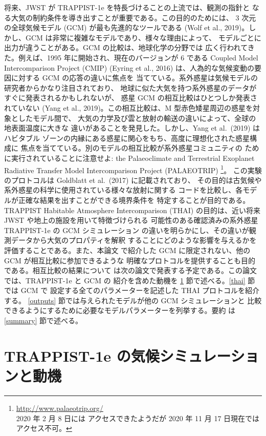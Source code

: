 \documentclass{dennou777}
\begin{document}
将来、JWST が TRAPPIST-1e を特長づけることの上流では、観測の指針と
なる大気の制約条件を導き出すことが重要である。この目的のためには、
3 次元の全球気候モデル (GCM) が最も先進的なツールである (Wolf et al.,
2019)。しかし、GCM は非常に複雑なモデルであり、様々な理由によって、
モデルごとに出力が違うことがある。GCM の比較は、地球化学の分野では
広く行われてきた。例えば、1995 年に開始され、現在のバージョンが 6
である Coupled Model Intercomparison Project (CMIP) (Eyring et al.,
2016) は、人為的な気候変動の要因に対する GCM の応答の違いに焦点を
当てている。系外惑星は気候モデルの研究者からかなり注目されており、
地球に似た大気を持つ系外惑星のデータがすぐに発表されるかもしれないが、
惑星 GCM の相互比較はひとつしか発表されていない (Yang et al.,
2019)。この相互比較は、M 型赤色矮星周辺の惑星を対象としたモデル間で、
大気の力学及び雲と放射の輸送の違いによって、全球の地表面温度に大きな
違いがあることを発見した。しかし、Yang et al.\ (2019) はハビタブル
ゾーンの内縁にある惑星に関心をもち、高度に理想化された惑星構成に
焦点を当てている。別のモデルの相互比較が系外惑星コミュニティの
ために実行されていることに注意せよ: the Palaeoclimate and Terrestrial
Exoplanet Radiative Transfer Model Intercomparison Project (PALAEOTRIP)%
\footnote{\url{http://www.palaeotrip.org/}\\2020 年 2 月 8 日には
アクセスできたようだが 2020 年 11 月 17 日現在ではアクセス不可。}。
この実験のプロトコルは Goldblatt et al.\ (2017) に記載されており、
その目的は古気候や系外惑星の科学に使用されている様々な放射に関する
コードを比較し、各モデルが正確な結果を出すことができる境界条件を
特定することが目的である。TRAPPIST Habitable Atmosphere Intercomparison
(THAI) の目的は、近い将来 JWST や地上の施設を用いて特徴づけられる
可能性のある確認済みの系外惑星 TRAPPIST-1e の GCM シミュレーション
の違いを明らかにし、その違いが観測データから大気のプロパティを解釈
することにどのような影響を与えるかを評価することである。また、本論文
で紹介した GCM に限定されない、他の GCM が相互比較に参加できるような
明確なプロトコルを提供することも目的である。相互比較の結果について
は次の論文で発表する予定である。この論文では、TRAPPIST-1e と GCM の
紹介を含めた動機を \ref{motiv} 節で述べる。\ref{thai} 節では GCM で
設定する全てのパラメーターを記述した THAI プロトコルを紹介する。
\ref{outputs} 節では与えられたモデルが他の GCM シミュレーションと
比較できるようにするために必要なモデルパラメーターを列挙する。要約
は \ref{summary} 節で述べる。

\section{TRAPPIST-1e の気候シミュレーションと動機}\label{motiv}
\end{document}
